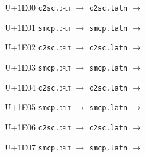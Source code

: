 \documentclass{article}
\begin{document}
\begin{substitutions}

U+1E00  \linebreak
    \texttt{c2sc.\textsc{dflt}} $\to$  \linebreak
    \texttt{c2sc.latn} $\to$  

\goodbreak

U+1E01  \linebreak
    \texttt{smcp.\textsc{dflt}} $\to$  \linebreak
    \texttt{smcp.latn} $\to$  

\goodbreak

U+1E02  \linebreak
    \texttt{c2sc.\textsc{dflt}} $\to$  \linebreak
    \texttt{c2sc.latn} $\to$  

\goodbreak

U+1E03  \linebreak
    \texttt{smcp.\textsc{dflt}} $\to$  \linebreak
    \texttt{smcp.latn} $\to$  

\goodbreak

U+1E04  \linebreak
    \texttt{c2sc.\textsc{dflt}} $\to$  \linebreak
    \texttt{c2sc.latn} $\to$  

\goodbreak

U+1E05  \linebreak
    \texttt{smcp.\textsc{dflt}} $\to$  \linebreak
    \texttt{smcp.latn} $\to$  

\goodbreak

U+1E06  \linebreak
    \texttt{c2sc.\textsc{dflt}} $\to$  \linebreak
    \texttt{c2sc.latn} $\to$  

\goodbreak

U+1E07  \linebreak
    \texttt{smcp.\textsc{dflt}} $\to$  \linebreak
    \texttt{smcp.latn} $\to$  


\end{substitutions}
\end{document}
